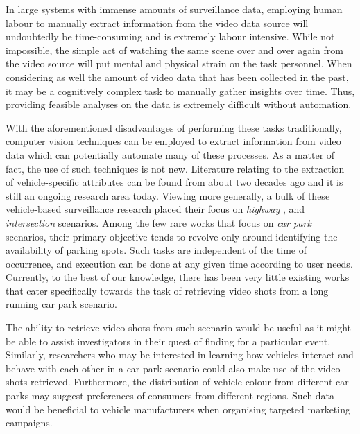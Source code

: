 
In large systems with immense amounts of surveillance data, employing human labour to manually extract information from the video data source will undoubtedly be time-consuming and is extremely labour intensive.
While not impossible, the simple act of watching the same scene over and over again from the video source will put mental and physical strain on the task personnel. When considering as well the amount of video data that has been collected in the past, it may be a cognitively complex task to manually gather insights over time. Thus, providing feasible analyses on the data is extremely difficult without automation.

With the aforementioned disadvantages of performing these tasks traditionally, computer vision techniques can be employed to extract information from video data which can potentially automate many of these processes. As a matter of fact, the use of such techniques is not new. %
Literature relating to the extraction of vehicle-specific attributes can be found from about two decades ago and it is still an ongoing research area today. Viewing more generally, a bulk of these vehicle-based surveillance research placed their focus on \textit{highway} \cite{yu2017improved, cao2016vehicle, arya2016real, liu2016highway, al2016adaptive}, and  \textit{intersection} \cite{meng2017traffic, choong2017modeling, ren2018learning} scenarios. Among the few rare works \cite{shi2017study, marmol2016quickspot, ling2017identifying} that focus on \emph{car park} scenarios, their primary objective tends to revolve only around identifying the availability of parking spots. Such tasks are independent of the time of occurrence, and execution can be done at any given time according to user needs. Currently, to the best of our knowledge, there has been very little existing works that cater specifically towards the task of retrieving video shots from a long running car park scenario.

The ability to retrieve video shots from such scenario would be useful as it might be able to assist investigators in their quest of finding for a particular event. Similarly, researchers who may be interested in learning how vehicles interact and behave with each other in a car park scenario could also make use of the video shots retrieved. Furthermore, the distribution of vehicle colour from different car parks may suggest preferences of consumers from different regions. Such data would be beneficial to vehicle manufacturers when organising targeted marketing campaigns.

